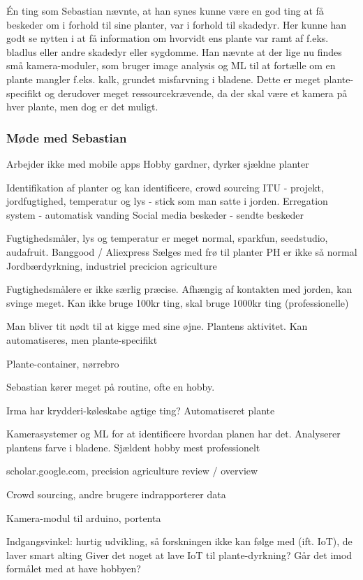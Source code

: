 Én ting som Sebastian nævnte, at han synes kunne være en god ting at få beskeder om i forhold til sine planter, var i forhold til skadedyr. Her kunne han godt se nytten i at få information om hvorvidt ens plante var ramt af f.eks. bladlus eller andre skadedyr eller sygdomme. Han nævnte at der lige nu findes små kamera-moduler, som bruger image analysis og ML til at fortælle om en plante mangler f.eks. kalk, grundet misfarvning i bladene. Dette er meget plante-specifikt og derudover meget ressourcekrævende, da der skal være et kamera på hver plante, men dog er det muligt.

\subsubsection*{Møde med Sebastian}
Arbejder ikke med mobile apps
Hobby gardner, dyrker sjældne planter

Identifikation af planter og kan identificere, crowd sourcing
ITU - projekt, jordfugtighed, temperatur og lys - stick som man satte i jorden.
	Erregation system - automatisk vanding
	Social media beskeder - sendte beskeder

Fugtighedsmåler, lys og temperatur er meget normal, sparkfun, seedstudio, audafruit. Banggood / Aliexpress
Sælges med frø til planter
PH er ikke så normal
Jordbærdyrkning, industriel precicion agriculture

Fugtighedsmålere er ikke særlig præcise. Afhængig af kontakten med jorden, kan svinge meget.
Kan ikke bruge 100kr ting, skal bruge 1000kr ting (professionelle)

Man bliver tit nødt til at kigge med sine øjne. Plantens aktivitet.
Kan automatiseres, men plante-specifikt

Plante-container, nørrebro

Sebastian kører meget på routine, ofte en hobby.

Irma har krydderi-køleskabe agtige ting? Automatiseret plante

Kamerasystemer og ML for at identificere hvordan planen har det. Analyserer plantens farve i bladene.
Sjældent hobby mest professionelt

scholar.google.com, precision agriculture review / overview

Crowd sourcing, andre brugere indrapporterer data

Kamera-modul til arduino, portenta

Indgangsvinkel: hurtig udvikling, så forskningen ikke kan følge med (ift. IoT), de laver smart alting
Giver det noget at lave IoT til plante-dyrkning? Går det imod formålet med at have hobbyen?

